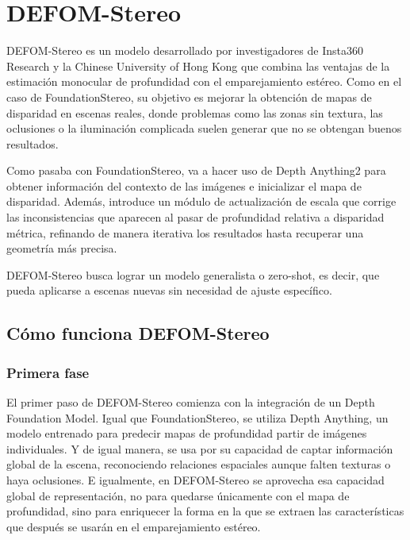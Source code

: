 
\section{DEFOM-Stereo}
DEFOM-Stereo es un modelo desarrollado por investigadores de Insta360 Research y la Chinese University of Hong Kong que combina las ventajas de la estimación monocular de profundidad con el emparejamiento estéreo. Como en el caso de FoundationStereo, su objetivo es mejorar la obtención de mapas de disparidad en escenas reales, donde problemas como las zonas sin textura, las oclusiones o la iluminación complicada suelen generar que no se obtengan buenos resultados.

Como pasaba con FoundationStereo, va a hacer uso de Depth Anything2 para obtener información del contexto de las imágenes e inicializar el mapa de disparidad. Además, introduce un módulo de actualización de escala que corrige las inconsistencias que aparecen al pasar de profundidad relativa a disparidad métrica, refinando de manera iterativa los resultados hasta recuperar una geometría más precisa.

DEFOM-Stereo busca lograr un modelo generalista o zero-shot, es decir, que pueda aplicarse a escenas nuevas sin necesidad de ajuste específico.


\subsection{Cómo funciona DEFOM-Stereo}
\subsubsection{Primera fase}
El primer paso de DEFOM-Stereo comienza con la integración de un Depth Foundation Model. Igual que FoundationStereo, se utiliza Depth Anything, un modelo entrenado para predecir mapas de profundidad partir de imágenes individuales. Y de igual manera, se usa por su capacidad de captar información global de la escena, reconociendo relaciones espaciales aunque falten texturas o haya oclusiones. E igualmente, en DEFOM-Stereo se aprovecha esa capacidad global de representación, no para quedarse únicamente con el mapa de profundidad, sino para enriquecer la forma en la que se extraen las características que después se usarán en el emparejamiento estéreo.

